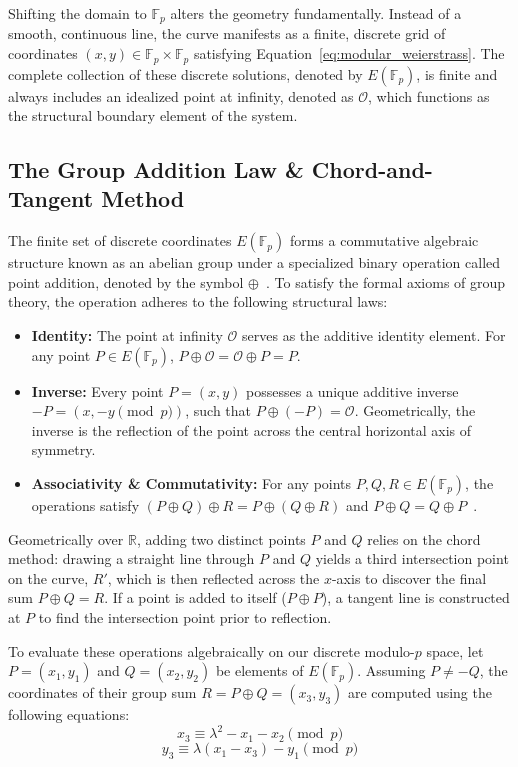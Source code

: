 \documentclass[11pt,a4paper]{article}
\begin{document}
Shifting the domain to $\mathbb{F}_p$ alters the geometry fundamentally. Instead of a smooth, continuous line, the curve manifests as a finite, discrete grid of coordinates $(x, y) \in \mathbb{F}_p \times \mathbb{F}_p$ satisfying Equation~\ref{eq:modular_weierstrass}. The complete collection of these discrete solutions, denoted by $E(\mathbb{F}_p)$, is finite and always includes an idealized point at infinity, denoted as $\mathcal{O}$, which functions as the structural boundary element of the system.

\subsection{The Group Addition Law \& Chord-and-Tangent Method}
The finite set of discrete coordinates $E(\mathbb{F}_p)$ forms a commutative algebraic structure known as an abelian group under a specialized binary operation called point addition, denoted by the symbol $\oplus$~\cite{hoffstein}. To satisfy the formal axioms of group theory, the operation adheres to the following structural laws:
\begin{itemize}
    \item \textbf{Identity:} The point at infinity $\mathcal{O}$ serves as the additive identity element. For any point $P \in E(\mathbb{F}_p)$, $P \oplus \mathcal{O} = \mathcal{O} \oplus P = P$.
    \item \textbf{Inverse:} Every point $P = (x, y)$ possesses a unique additive inverse $-P = (x, -y \pmod{p})$, such that $P \oplus (-P) = \mathcal{O}$. Geometrically, the inverse is the reflection of the point across the central horizontal axis of symmetry.
    \item \textbf{Associativity \& Commutativity:} For any points $P, Q, R \in E(\mathbb{F}_p)$, the operations satisfy $(P \oplus Q) \oplus R = P \oplus (Q \oplus R)$ and $P \oplus Q = Q \oplus P$~\cite{washington}.
\end{itemize}

Geometrically over $\mathbb{R}$, adding two distinct points $P$ and $Q$ relies on the chord method: drawing a straight line through $P$ and $Q$ yields a third intersection point on the curve, $R'$, which is then reflected across the $x$-axis to discover the final sum $P \oplus Q = R$. If a point is added to itself ($P \oplus P$), a tangent line is constructed at $P$ to find the intersection point prior to reflection.

To evaluate these operations algebraically on our discrete modulo-$p$ space, let $P = (x_1, y_1)$ and $Q = (x_2, y_2)$ be elements of $E(\mathbb{F}_p)$. Assuming $P \neq -Q$, the coordinates of their group sum $R = P \oplus Q = (x_3, y_3)$ are computed using the following equations:
\begin{equation}
    x_3 \equiv \lambda^2 - x_1 - x_2 \pmod{p}
    \label{eq:add_x}
\end{equation}
\begin{equation}
    y_3 \equiv \lambda(x_1 - x_3) - y_1 \pmod{p}
    \label{eq:add_y}
\end{equation}
\end{document}
